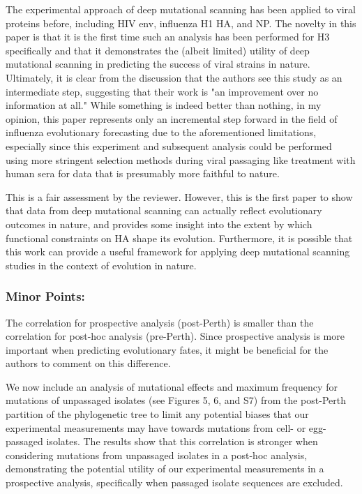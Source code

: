 \documentclass[11pt, oneside]{article}   	%
\newcommand{\response}[1]{{\color{black}#1}}
\begin{document}
The experimental approach of deep mutational scanning has been applied to viral proteins before, including HIV env, influenza H1 HA, and NP. The novelty in this paper is that it is the first time such an analysis has been performed for H3 specifically and that it demonstrates the (albeit limited) utility of deep mutational scanning in predicting the success of viral strains in nature. Ultimately, it is clear from the discussion that the authors see this study as an intermediate step, suggesting that their work is "an improvement over no information at all." While something is indeed better than nothing, in my opinion, this paper represents only an incremental step forward in the field of influenza evolutionary forecasting due to the aforementioned limitations, especially since this experiment and subsequent analysis could be performed using more stringent selection methods during viral passaging like treatment with human sera for data that is presumably more faithful to nature. 

\response{This is a fair assessment by the reviewer.
However, this is the first paper to show that data from deep mutational scanning can actually reflect evolutionary outcomes in nature, and provides some insight into the extent by which functional constraints on HA shape its evolution. 
Furthermore, it is possible that this work can provide a useful framework for applying deep mutational scanning studies in the context of evolution in nature.
}

\subsubsection*{Minor Points:} 

The correlation for prospective analysis (post-Perth) is smaller than the correlation for post-hoc analysis (pre-Perth). Since prospective analysis is more important when predicting evolutionary fates, it might be beneficial for the authors to comment on this difference. 

\response{We now include an analysis of mutational effects and maximum frequency for mutations of unpassaged isolates (see Figures 5, 6, and S7) from the post-Perth partition of the phylogenetic tree to limit any potential biases that our experimental measurements may have towards mutations from cell- or egg-passaged isolates.
The results show that this correlation is stronger when considering mutations from unpassaged isolates in a post-hoc analysis, demonstrating the potential utility of our experimental measurements in a prospective analysis, specifically when passaged isolate sequences are excluded.
}
\end{document}
